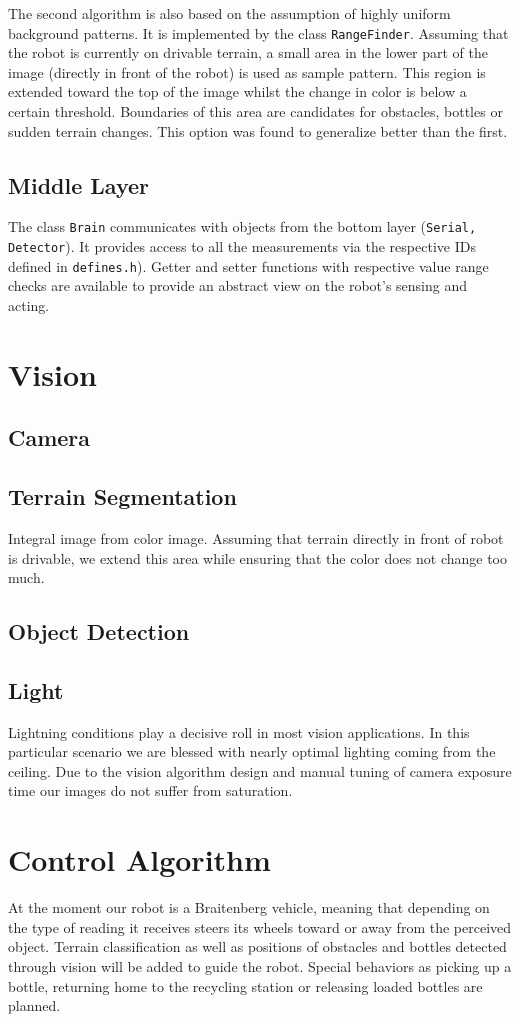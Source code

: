 The second algorithm is also based on the assumption of highly uniform background
patterns. It is implemented by the class \texttt{RangeFinder}. Assuming that the robot
is currently on drivable terrain, a small area in the lower part of the image (directly
in front of the robot) is used as sample pattern. This region is extended toward the
top of the image whilst the change in color is below a certain threshold. Boundaries
of this area are candidates for obstacles, bottles or sudden terrain changes. This 
option was found to generalize better than the first.

\subsection{Middle Layer}
The class \texttt{Brain} communicates with objects from the bottom layer (\texttt{Serial, Detector}).
It provides access to all the measurements via the respective IDs defined in \texttt{defines.h}).
Getter and setter functions with respective value range checks are available to provide
an abstract view on the robot's sensing and acting. 

\section{Vision}

\subsection{Camera}

\subsection{Terrain Segmentation}
Integral image from color image. Assuming that terrain directly in front of robot is 
drivable, we extend this area while ensuring that the color does not change too much.

\subsection{Object Detection}

\subsection{Light}
Lightning conditions play a decisive roll in most vision applications. In this
particular scenario we are blessed with nearly optimal lighting coming from the
ceiling. Due to the vision algorithm design and manual tuning of camera exposure time
our images do not suffer from saturation.

\section{Control Algorithm}
At the moment our robot is a Braitenberg vehicle, meaning that depending on the type
of reading it receives steers its wheels toward or away from the perceived object. 
Terrain classification as well as positions of obstacles and bottles detected through 
vision will be added to guide the robot. Special behaviors as picking up a bottle, 
returning home to the recycling station or releasing loaded bottles are planned.

